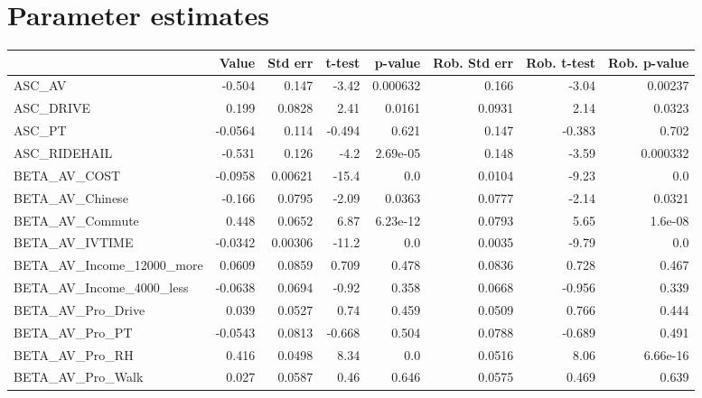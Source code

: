 \section{Parameter estimates}
\begin{tabular}{lrrrrrrr}
\toprule
{} &    Value &  Std err &  t-test &  p-value &  Rob. Std err &  Rob. t-test &  Rob. p-value \\
\midrule
ASC\_AV                       &   -0.504 &    0.147 &   -3.42 & 0.000632 &         0.166 &        -3.04 &       0.00237 \\
ASC\_DRIVE                    &    0.199 &   0.0828 &    2.41 &   0.0161 &        0.0931 &         2.14 &        0.0323 \\
ASC\_PT                       &  -0.0564 &    0.114 &  -0.494 &    0.621 &         0.147 &       -0.383 &         0.702 \\
ASC\_RIDEHAIL                 &   -0.531 &    0.126 &    -4.2 & 2.69e-05 &         0.148 &        -3.59 &      0.000332 \\
BETA\_AV\_COST                 &  -0.0958 &  0.00621 &   -15.4 &      0.0 &        0.0104 &        -9.23 &           0.0 \\
BETA\_AV\_Chinese              &   -0.166 &   0.0795 &   -2.09 &   0.0363 &        0.0777 &        -2.14 &        0.0321 \\
BETA\_AV\_Commute              &    0.448 &   0.0652 &    6.87 & 6.23e-12 &        0.0793 &         5.65 &       1.6e-08 \\
BETA\_AV\_IVTIME               &  -0.0342 &  0.00306 &   -11.2 &      0.0 &        0.0035 &        -9.79 &           0.0 \\
BETA\_AV\_Income\_12000\_more    &   0.0609 &   0.0859 &   0.709 &    0.478 &        0.0836 &        0.728 &         0.467 \\
BETA\_AV\_Income\_4000\_less     &  -0.0638 &   0.0694 &   -0.92 &    0.358 &        0.0668 &       -0.956 &         0.339 \\
BETA\_AV\_Pro\_Drive            &    0.039 &   0.0527 &    0.74 &    0.459 &        0.0509 &        0.766 &         0.444 \\
BETA\_AV\_Pro\_PT               &  -0.0543 &   0.0813 &  -0.668 &    0.504 &        0.0788 &       -0.689 &         0.491 \\
BETA\_AV\_Pro\_RH               &    0.416 &   0.0498 &    8.34 &      0.0 &        0.0516 &         8.06 &      6.66e-16 \\
BETA\_AV\_Pro\_Walk             &    0.027 &   0.0587 &    0.46 &    0.646 &        0.0575 &        0.469 &         0.639 \\

\end{tabular}

